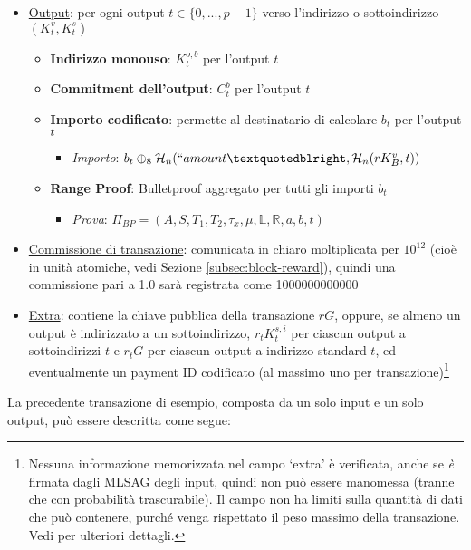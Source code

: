 \begin{itemize}
    \item \underline{Output}: per ogni output $t \in \{0,...,p-1\}$ verso l’indirizzo o sottoindirizzo $(K^v_t,K^s_t)$
    \begin{itemize}
        \item \textbf{Indirizzo monouso}: $K^{o,b}_t$ per l’output $t$
        \item \textbf{Commitment dell’output}: $C^{b}_t$ per l’output $t$
        \item \textbf{Importo codificato}: permette al destinatario di calcolare $b_t$ per l’output $t$
        \begin{itemize}
            \item \textit{Importo}: $b_t \oplus_8 \mathcal{H}_n(``amount”, \mathcal{H}_n(r K_B^v, t))$
        \end{itemize}
        \item \textbf{Range Proof}: Bulletproof aggregato per tutti gli importi $b_t$
        \begin{itemize}
            \item \textit{Prova}: $\Pi_{BP} = (A, S, T_1, T_2, \tau_x, \mu, \mathbb{L}, \mathbb{R}, a, b, t)$
        \end{itemize}
    \end{itemize}
    \item \underline{Commissione di transazione}: comunicata in chiaro moltiplicata per $10^{12}$ (cioè in unità atomiche, vedi Sezione \ref{subsec:block-reward}), quindi una commissione pari a 1.0 sarà registrata come 1000000000000
    \item \underline{Extra}: contiene la chiave pubblica della transazione $r G$, oppure, se almeno un output è indirizzato a un sottoindirizzo, $r_t K^{s,i}_t$ per ciascun output a sottoindirizzi $t$ e $r_t G$ per ciascun output a indirizzo standard $t$, ed eventualmente un payment ID codificato (al massimo uno per transazione)\footnote{Nessuna informazione memorizzata nel campo `extra' è verificata, anche se {\em è} firmata dagli MLSAG degli input, quindi non può essere manomessa (tranne che con probabilità trascurabile). Il campo non ha limiti sulla quantità di dati che può contenere, purché venga rispettato il peso massimo della transazione. Vedi \cite{extra-field-stackexchange} per ulteriori dettagli.}
\end{itemize}

La precedente transazione di esempio, composta da un solo input e un solo output, può essere descritta come segue:

